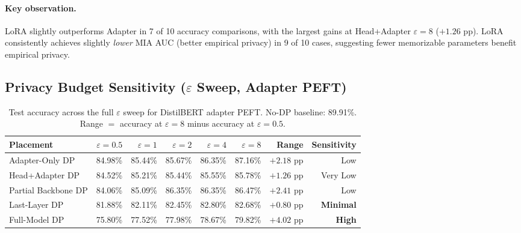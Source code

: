 \documentclass[11pt,letterpaper]{article}
\newcommand{\eps}{\varepsilon}
\begin{document}
\paragraph{Key observation.}
LoRA slightly outperforms Adapter in 7 of 10 accuracy comparisons, with
the largest gains at Head+Adapter $\eps=8$ ($+1.26$ pp).
LoRA consistently achieves slightly \emph{lower} MIA AUC (better empirical privacy)
in 9 of 10 cases, suggesting fewer memorizable parameters benefit empirical privacy.

\subsection{Privacy Budget Sensitivity ($\eps$ Sweep, Adapter PEFT)}

\begin{table}[h]
\centering
\caption{Test accuracy across the full $\eps$ sweep for DistilBERT adapter PEFT.
  No-DP baseline: 89.91\%.
  Range $=$ accuracy at $\eps=8$ minus accuracy at $\eps=0.5$.}
\label{tab:eps_sweep_acc}
\small
\setlength{\tabcolsep}{5pt}
\begin{tabular}{lrrrrrrr}
\toprule
\textbf{Placement}
  & $\eps=0.5$ & $\eps=1$ & $\eps=2$ & $\eps=4$ & $\eps=8$
  & \textbf{Range} & \textbf{Sensitivity} \\
\midrule
Adapter-Only DP    & 84.98\% & 85.44\% & 85.67\% & 86.35\% & 87.16\% & $+2.18$ pp & Low \\
Head+Adapter DP    & 84.52\% & 85.21\% & 85.44\% & 85.55\% & 85.78\% & $+1.26$ pp & Very Low \\
Partial Backbone DP & 84.06\% & 85.09\% & 86.35\% & 86.35\% & 86.47\% & $+2.41$ pp & Low \\
Last-Layer DP      & 81.88\% & 82.11\% & 82.45\% & 82.80\% & 82.68\% & $+0.80$ pp & \textbf{Minimal} \\
Full-Model DP      & 75.80\% & 77.52\% & 77.98\% & 78.67\% & 79.82\% & $+4.02$ pp & \textbf{High} \\
\bottomrule
\end{tabular}
\end{table}
\end{document}
